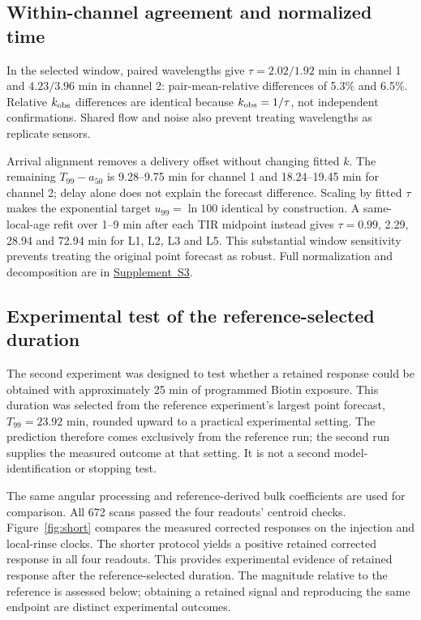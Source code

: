 \documentclass[lettersize,journal]{IEEEtran}
\newcommand{\supp}[1]{\href{SPR_smart_stop_supplement.pdf}{Supplement~#1}}
\begin{document}
\subsection{Within-channel agreement and normalized time}
In the selected window, paired wavelengths give $\tau=2.02/1.92$ min in
channel 1 and $4.23/3.96$ min in channel 2: pair-mean-relative differences
of 5.3\% and 6.5\%. Relative $k_{\rm obs}$ differences are identical
because $k_{\rm obs}=1/\tau$, not independent confirmations. Shared flow
and noise also prevent treating wavelengths as replicate sensors.

Arrival alignment removes a delivery offset without changing fitted $k$.
The remaining $T_{99}-a_{50}$ is 9.28--9.75 min for channel 1 and
18.24--19.45 min for channel 2; delay alone does not explain the forecast
difference. Scaling by fitted $\tau$ makes the exponential target
$u_{99}=\ln100$ identical by construction. A same-local-age refit over
1--9 min after each TIR midpoint instead gives $\tau=0.99$, 2.29, 28.94
and 72.94 min for L1, L2, L3 and L5. This substantial window sensitivity
prevents treating the original point forecast as robust. Full
normalization and decomposition are in \supp{S3}.

\subsection{Experimental test of the reference-selected duration}\label{sec:short}
The second experiment was designed to test whether a retained response
could be obtained with approximately 25 min of programmed Biotin exposure.
This duration was selected from the reference experiment's largest
point forecast, $T_{99}=23.92$ min, rounded upward to a practical
experimental setting. The prediction therefore comes exclusively from
the reference run; the second run supplies the measured outcome at that
setting. It is not a second model-identification or stopping test.

The same angular processing and reference-derived bulk coefficients are
used for comparison. All 672 scans passed the four readouts' centroid
checks. Figure~\ref{fig:short} compares the measured corrected responses
on the injection and local-rinse clocks. The shorter protocol yields a
positive retained corrected response in all four readouts. This provides
experimental evidence of retained response after the reference-selected
duration. The magnitude relative to the reference is assessed below;
obtaining a retained signal and reproducing the same endpoint are distinct
experimental outcomes.
\end{document}
